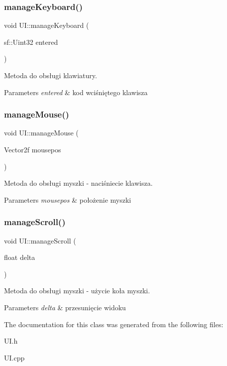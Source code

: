 \subsubsection{\texorpdfstring{manageKeyboard()}{manageKeyboard()}}
{\footnotesize\ttfamily void U\+I\+::manage\+Keyboard (\begin{DoxyParamCaption}\item[{sf\+::\+Uint32}]{entered }\end{DoxyParamCaption})}



Metoda do obsługi klawiatury. 


\begin{DoxyParams}{Parameters}
{\em entered} & kod wciśniętego klawisza \\
\hline
\end{DoxyParams}
\mbox{\label{class_u_i_a132cf813c56c65d3756dc136b021de1c}} 
\subsubsection{\texorpdfstring{manageMouse()}{manageMouse()}}
{\footnotesize\ttfamily void U\+I\+::manage\+Mouse (\begin{DoxyParamCaption}\item[{Vector2f}]{mousepos }\end{DoxyParamCaption})}



Metoda do obsługi myszki -\/ naciśniecie klawisza. 


\begin{DoxyParams}{Parameters}
{\em mousepos} & położenie myszki \\
\hline
\end{DoxyParams}
\mbox{\label{class_u_i_a94799c22dde5791cc3428a307b5edd41}} 
\subsubsection{\texorpdfstring{manageScroll()}{manageScroll()}}
{\footnotesize\ttfamily void U\+I\+::manage\+Scroll (\begin{DoxyParamCaption}\item[{float}]{delta }\end{DoxyParamCaption})}



Metoda do obsługi myszki -\/ użycie koła myszki. 


\begin{DoxyParams}{Parameters}
{\em delta} & przesunięcie widoku \\
\hline
\end{DoxyParams}


The documentation for this class was generated from the following files\+:\begin{DoxyCompactItemize}
\item 
U\+I.\+h\item 
U\+I.\+cpp\end{DoxyCompactItemize}
